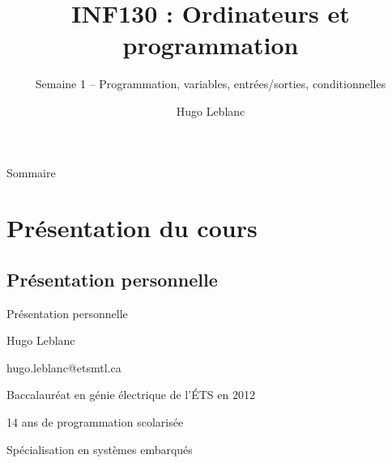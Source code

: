 \documentclass[aspectratio=169,usenames,dvipsnames]{beamer}
\title{INF130 : Ordinateurs et programmation}
\subtitle{Semaine 1 – Programmation, variables, entrées/sorties, conditionnelles}
\author{Hugo Leblanc}
\begin{document}
    \maketitle
    \begin{frame}[shrink=10]{Sommaire}
        \smallskip
        \tableofcontents
    \end{frame}

    \section{Présentation du cours}
    \subsection{Présentation personnelle}
    \begin{frame}{Présentation personnelle}
        \begin{description}
            \item Hugo Leblanc
            \item hugo.leblanc@etsmtl.ca
            \item Baccalauréat en génie électrique de l’ÉTS en 2012
            \item 14 ans de programmation scolarisée
            \item Spécialisation en systèmes embarqués
        \end{description}
    \end{frame}
\end{document}
